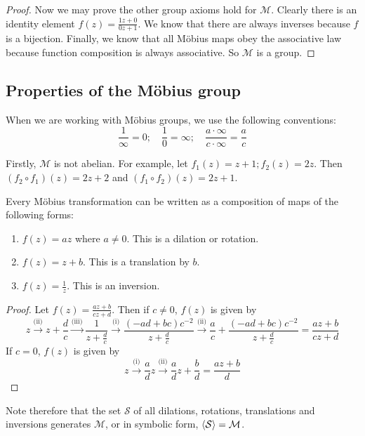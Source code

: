 \begin{proof}
	Now we may prove the other group axioms hold for \(\mathcal M\).
	Clearly there is an identity element \(f(z) = \frac{1z + 0}{0z + 1}\).
	We know that there are always inverses because \(f\) is a bijection.
	Finally, we know that all M\"obius maps obey the associative law because function composition is always associative.
	So \(\mathcal M\) is a group.
\end{proof}

\subsection{Properties of the M\"obius group}
When we are working with M\"obius groups, we use the following conventions:
\[
	\frac{1}{\infty} = 0;\quad \frac{1}{0} = \infty;\quad \frac{a\cdot\infty}{c\cdot\infty} = \frac{a}{c}
\]

Firstly, \(\mathcal M\) is not abelian.
For example, let \(f_1(z) = z + 1; f_2(z) = 2z\).
Then \((f_2 \circ f_1)(z) = 2z + 2\) and \((f_1 \circ f_2)(z) = 2z + 1\).

\begin{proposition}
	Every M\"obius transformation can be written as a composition of maps of the following forms:
	\begin{enumerate}
		\item \(f(z) = az\) where \(a\neq 0\).
		      This is a dilation or rotation.
		\item \(f(z) = z + b\).
		      This is a translation by \(b\).
		\item \(f(z) = \frac{1}{z}\).
		      This is an inversion.
	\end{enumerate}
\end{proposition}
\begin{proof}
	Let \(f(z) = \frac{az + b}{cz + d}\).
	Then if \(c \neq 0\), \(f(z)\) is given by
	\[
		z \xrightarrow{\text{(ii)}} z + \frac{d}{c} \xrightarrow{\text{(iii)}} \frac{1}{z + \frac{d}{c}} \xrightarrow{\text{(i)}} \frac{(-ad+bc)c^{-2}}{z + \frac{d}{c}} \xrightarrow{\text{(ii)}} \frac{a}{c} + \frac{(-ad+bc)c^{-2}}{z + \frac{d}{c}} = \frac{az + b}{cz + d}
	\]
	If \(c = 0\), \(f(z)\) is given by
	\[
		z \xrightarrow{\text{(i)}} \frac{a}{d}z \xrightarrow{\text{(ii)}} \frac{a}{d}z + \frac{b}{d} = \frac{az + b}{d}
	\]
\end{proof}
Note therefore that the set \(\mathcal S\) of all dilations, rotations, translations and inversions generates \(\mathcal M\), or in symbolic form, \(\left\langle{} \mathcal S \right\rangle = \mathcal M\).
